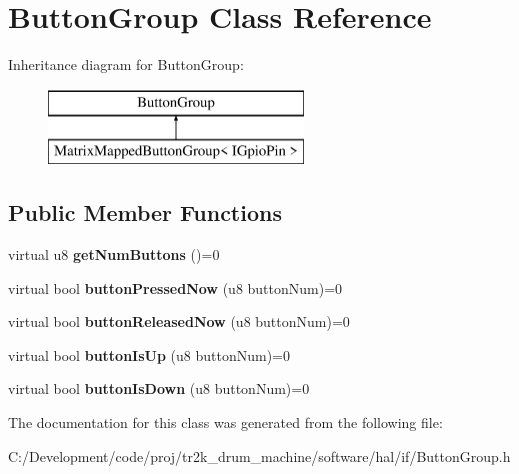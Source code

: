 \hypertarget{class_button_group}{}\section{Button\+Group Class Reference}
\label{class_button_group}
Inheritance diagram for Button\+Group\+:\begin{figure}[H]
\begin{center}
\leavevmode
\includegraphics[height=2.000000cm]{class_button_group}
\end{center}
\end{figure}
\subsection*{Public Member Functions}
\begin{DoxyCompactItemize}
\item 
\mbox{\label{class_button_group_ac238de24a624afc6d53de9a8e50d17b8}} 
virtual u8 {\bfseries get\+Num\+Buttons} ()=0
\item 
\mbox{\label{class_button_group_a5a93648aa496ee7ba94b6013346c43bd}} 
virtual bool {\bfseries button\+Pressed\+Now} (u8 button\+Num)=0
\item 
\mbox{\label{class_button_group_ac6d7771bcc91af75045e6d6b56153802}} 
virtual bool {\bfseries button\+Released\+Now} (u8 button\+Num)=0
\item 
\mbox{\label{class_button_group_a8da924612120ce865c52b83f4e2b9f3f}} 
virtual bool {\bfseries button\+Is\+Up} (u8 button\+Num)=0
\item 
\mbox{\label{class_button_group_a0d81f5c42506677286ef95eea4f52cd2}} 
virtual bool {\bfseries button\+Is\+Down} (u8 button\+Num)=0
\end{DoxyCompactItemize}


The documentation for this class was generated from the following file\+:\begin{DoxyCompactItemize}
\item 
C\+:/\+Development/code/proj/tr2k\+\_\+drum\+\_\+machine/software/hal/if/Button\+Group.\+h\end{DoxyCompactItemize}
